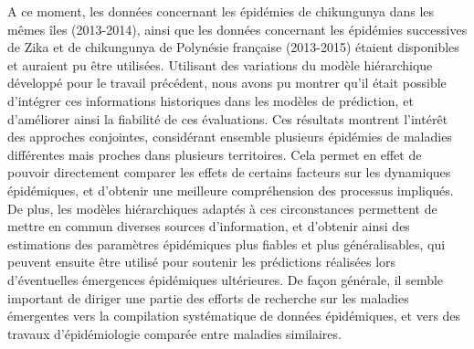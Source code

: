 A ce moment, les données concernant les épidémies de chikungunya dans les mêmes îles (2013-2014), ainsi que les données concernant les épidémies successives de Zika et de chikungunya de Polynésie française (2013-2015) étaient disponibles et auraient pu être utilisées.
Utilisant des variations du modèle hiérarchique développé pour le travail précédent, nous avons pu montrer qu'il était possible d'intégrer ces informations historiques dans les modèles de prédiction, et d'améliorer ainsi la fiabilité de ces évaluations.
Ces résultats montrent l'intérêt des approches conjointes, considérant ensemble plusieurs épidémies de maladies différentes mais proches dans plusieurs territoires.
Cela permet en effet de pouvoir directement comparer les effets de certains facteurs sur les dynamiques épidémiques, et d'obtenir une meilleure compréhension des processus impliqués.
De plus, les modèles hiérarchiques adaptés à ces circonstances permettent de mettre en commun diverses sources d'information, et d'obtenir ainsi des estimations des paramètres épidémiques plus fiables et plus généralisables, qui peuvent ensuite être utilisé pour soutenir les prédictions réalisées lors d'éventuelles émergences épidémiques ultérieures.
De façon générale, il semble important de diriger une partie des efforts de recherche sur les maladies émergentes vers la compilation systématique de données épidémiques, et vers des travaux d'épidémiologie comparée entre maladies similaires.

